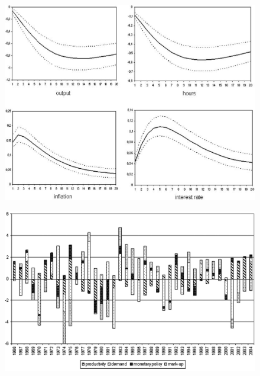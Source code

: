 \documentclass{beamer}
\begin{document}
\begin{frame}
  \begin{figure}
    \includegraphics{sw_figure3.eps}
  \end{figure}
\end{frame}

\begin{frame}
  \begin{figure}
    \includegraphics{sw_figure4_gdp.eps}
  \end{figure}
\end{frame}
\end{document}
